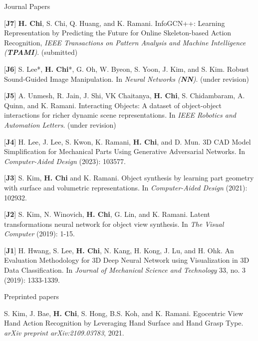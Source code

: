 \begin{cventries}
\vspace{-.5em}
\cvpub
{Journal Papers} %
{ %
\begin{cvitems}
    \item {[\textbf{J7}] \textbf{H. Chi}, S. Chi, Q. Huang, and K. Ramani. InfoGCN++: Learning Representation by Predicting the Future for Online Skeleton-based Action Recognition, \textit{IEEE Transactions on Pattern Analysis and Machine Intelligence (\textbf{TPAMI})}. (submitted) }
    \item {[\textbf{J6}] S. Lee*, \textbf{H. Chi}*, G. Oh, W. Byeon, S. Yoon, J. Kim, and S. Kim. Robust Sound-Guided Image Manipulation. In \textit{Neural Networks (\textbf{NN})}. (under revision)}
    \item {[\textbf{J5}] A. Unmesh,  R. Jain, J. Shi, VK Chaitanya, \textbf{H. Chi}, S. Chidambaram, A. Quinn, and K. Ramani. Interacting Objects: A dataset of object-object interactions for richer dynamic scene representations. In \textit{IEEE Robotics and Automation Letters}. (under revision)}
    \item {[\textbf{J4}] H. Lee, J. Lee, S. Kwon, K. Ramani, \textbf{H. Chi}, and D. Mun. 3D CAD Model Simplification for Mechanical Parts Using Generative Adversarial Networks. In \textit{Computer-Aided Design} (2023): 103577.}
    \item {[\textbf{J3}] S. Kim, \textbf{H. Chi} and K. Ramani. Object synthesis by learning part geometry with surface and volumetric representations. In \textit{Computer-Aided Design} (2021): 102932.}
    \item {[\textbf{J2}] S. Kim, N. Winovich, \textbf{H. Chi}, G. Lin, and K. Ramani. Latent transformations neural network for object view synthesis. In \textit{The Visual Computer} (2019): 1-15.}
    \item {[\textbf{J1}] H. Hwang, S. Lee, \textbf{H. Chi}, N. Kang, H. Kong, J. Lu, and H. Ohk. An Evaluation Methodology for 3D Deep Neural Network using Visualization in 3D Data Classification. In \textit{Journal of Mechanical Science and Technology} 33, no. 3 (2019): 1333-1339.}
\end{cvitems}
}

\vspace{-.5em}
\cvpub
{Preprinted papers} %
{
\begin{cvitems}
    \item {S. Kim, J. Bae, \textbf{H. Chi}, S. Hong, B.S. Koh, and K. Ramani. Egocentric View Hand Action Recognition by Leveraging Hand Surface and Hand Grasp Type. \textit{arXiv preprint arXiv:2109.03783}, 2021. }
\end{cvitems}
}




\end{cventries}
